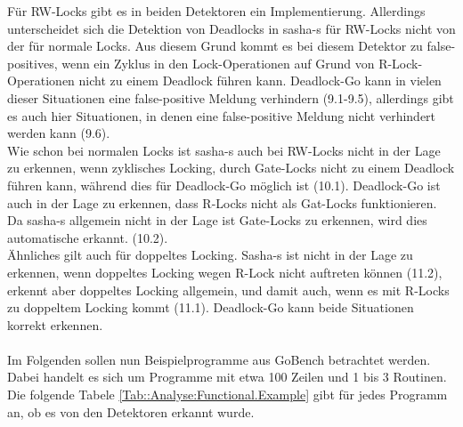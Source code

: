 Für RW-Locks gibt es in beiden Detektoren ein Implementierung. Allerdings unterscheidet
sich die Detektion von Deadlocks in sasha-s für RW-Locks nicht von der für 
normale Locks. Aus diesem Grund kommt es bei diesem Detektor zu false-positives,
wenn ein Zyklus in den Lock-Operationen auf Grund von R-Lock-Operationen nicht 
zu einem Deadlock führen kann. Deadlock-Go kann in vielen dieser Situationen 
eine false-positive Meldung verhindern (9.1-9.5), allerdings gibt es auch hier 
Situationen, in denen eine false-positive Meldung nicht verhindert werden kann (9.6).\\
Wie schon bei normalen Locks ist sasha-s auch bei RW-Locks nicht in der Lage 
zu erkennen, wenn zyklisches Locking, durch Gate-Locks nicht zu einem Deadlock 
führen kann, während dies für Deadlock-Go möglich ist (10.1). Deadlock-Go
ist auch in der Lage 
zu erkennen, dass R-Locks nicht als Gat-Locks funktionieren. Da sasha-s allgemein 
nicht in der Lage ist Gate-Locks zu erkennen, wird dies automatische erkannt. (10.2).\\
Ähnliches gilt auch für doppeltes Locking. Sasha-s ist 
nicht in der Lage zu erkennen, wenn doppeltes Locking wegen R-Lock nicht auftreten 
können (11.2), erkennt aber doppeltes Locking allgemein, und damit auch, wenn 
es mit R-Locks zu doppeltem Locking kommt (11.1). Deadlock-Go kann beide Situationen
korrekt erkennen.
\\\\
Im Folgenden sollen nun Beispielprogramme aus GoBench \cite{gobench}
betrachtet werden. Dabei handelt es sich um Programme mit etwa 100 Zeilen und 
1 bis 3 Routinen.
Die folgende Tabele \ref{Tab::Analyse:Functional.Example} gibt für jedes Programm an,
 ob es von den Detektoren erkannt wurde.
